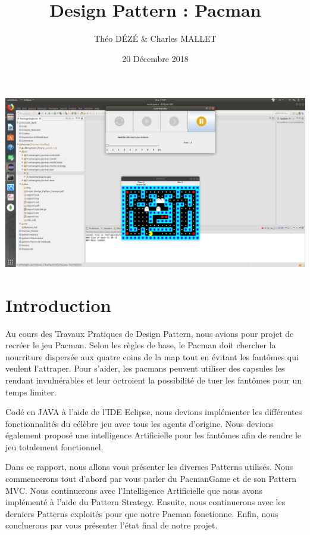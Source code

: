 \documentclass[a4paper, 11pt]{article}
\begin{document}
\title{Design Pattern : Pacman}
\author{Théo \textsc{DÉZÉ}  \& Charles \textsc {MALLET}}
\date{20 Décembre 2018} 


\maketitle

\includegraphics[scale=0.7,trim=26.2cm 5cm 23.9cm 17.7cm, clip=true]{img/Pacman.png}


\newpage

\tableofcontents

\pagebreak

\part*{Introduction}

Au cours des Travaux Pratiques de Design Pattern, nous avions pour projet de recréer le jeu Pacman. Selon les règles de base, le Pacman doit chercher la nourriture dispersée aux quatre 
coins de la map tout en évitant les fantômes qui veulent l'attraper. Pour s'aider, les pacmans peuvent utiliser des capsules les rendant invulnérables et leur octroient 
la possibilité de tuer les fantômes pour un temps limiter.

Codé en JAVA à l'aide de l'IDE Eclipse, nous devions implémenter les différentes fonctionnalités du célèbre jeu avec tous les agents d'origine. Nous devions également
proposé une intelligence Artificielle pour les fantômes afin de rendre le jeu totalement fonctionnel. 

Dans ce rapport, nous allons vous présenter les diverses Patterns utilisés. Nous commencerons tout d'abord par vous parler du PacmanGame et de son Pattern MVC. Nous continuerons
avec l'Intelligence Artificielle que nous avons implémenté à l'aide du Pattern Strategy. Ensuite, nous continuerons avec les derniers Patterns exploités pour que notre 
Pacman fonctionne. Enfin, nous concluerons par vous présenter l'état final de notre projet.
\end{document}
